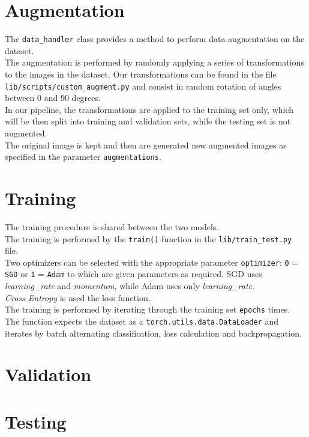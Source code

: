\documentclass{report}
\begin{document}
\section{Augmentation}
The \texttt{data\_handler} class provides a method to perform data augmentation on the dataset. \\
The augmentation is performed by randomly applying a series of transformations to the images in the dataset. Our transformations can be found in the file \texttt{lib/scripts/custom\_augment.py} and 
consist in random rotation of angles between 0 and 90 degrees.\\

In our pipeline, the transformations are applied to the training set only, which will be then split into training and validation sets, while the testing set is not augmented. \\
The original image is kept and then are generated new augmented images as specified in the parameter \texttt{augmentations}.\\

\section{Training}
The training procedure is shared between the two models. \\
The training is performed by the \texttt{train()} function in the \texttt{lib/train\_test.py} file. \\

Two optimizers can be selected with the appropriate parameter \texttt{optimizer}: \texttt{0} = \texttt{SGD} or \texttt{1} = \texttt{Adam} to which are given parameters
as required. SGD uses \textit{learning\_rate} and \textit{momentum}, while Adam uses only \textit{learning\_rate}. \\
\textit{Cross Entropy} is used the loss function. \\

The training is performed by iterating through the training set \texttt{epochs} times. \\
The function expects the dataset as a \texttt{torch.utils.data.DataLoader} and iterates by batch alternating classification, loss calculation and backpropagation.\\


\section{Validation}
\section{Testing}
\end{document}

